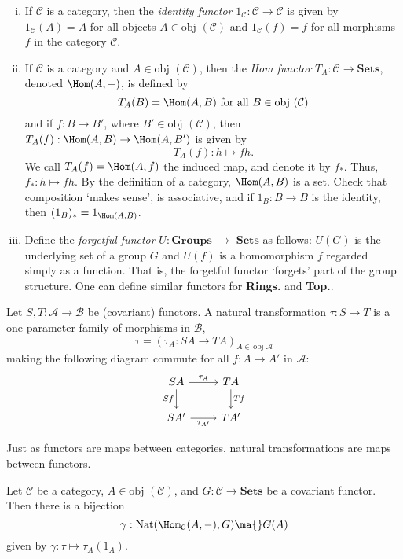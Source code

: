 \begin{ex} \hfill
	\begin{enumerate}[(i)]
	\item If $\mathcal{C}$ is a category, then the \emph{identity functor} $1_\mathcal{C}: \mathcal{C} \to \mathcal{C}$ is given by $1_\mathcal{C}(A)=A$ for all objects $A \in \text{obj }(\mathcal{C})$ and $1_\mathcal{C}(f)=f$ for all morphisms $f$ in the category $\mathcal{C}$.
	\item If $\mathcal{C}$ is a category and $A \in \text{obj }(\mathcal{C})$, then the \emph{Hom functor} $T_A: \mathcal{C} \to \textbf{Sets}$, denoted $\Hom(A, -)$, is defined by
		\[
		T_A(B)= \Hom(A,B) \text{ for all } B \in \text{obj }(\mathcal{C})
		\]
	and if $f: B \to B'$, where $B' \in \text{obj }(\mathcal{C})$, then $T_A(f): \Hom(A,B) \to \Hom(A,B')$ is given by
		\[
		T_A(f): h \mapsto fh.
		\]
	We call $T_A(f)=\Hom(A,f)$ the induced map, and denote it by $f_*$. Thus, $f_*: h \mapsto fh$. By the definition of a category, $\Hom(A,B)$ is a set. Check that composition `makes sense', is associative, and if $1_B: B \to B$ is the identity, then $(1_B)_*=1_{\Hom(A,B)}$. 
	\item Define the \emph{forgetful functor} $U: \textbf{Groups } \to \textbf{ Sets}$ as follows: $U(G)$ is the underlying set of a group $G$ and $U(f)$ is a homomorphism $f$ regarded simply as a function. That is, the forgetful functor `forgets' part of the group structure. One can define similar functors for \textbf{Rings.} and \textbf{Top.}. 
	\end{enumerate} \xqed
\end{ex}


\begin{dfn}
Let $S,T: \mathcal{A} \to \mathcal{B}$ be (covariant) functors. A natural transformation $\tau: S \to T$ is a one-parameter family of morphisms in $\mathcal{B}$,
	\[
	\tau= (\tau_A: SA \to TA)_{A \in \,\text{obj }\mathcal{A}}
	\]
making the following diagram commute for all $f: A \to A'$ in $\mathcal{A}$:
	\[
	\begin{tikzcd}
	SA \arrow{r}{\tau_A} \arrow[swap]{d}{Sf} & TA \arrow{d}{Tf} \\
	SA' \arrow[swap]{r}{\tau_{A'}} & TA'
	\end{tikzcd}
	\]
\end{dfn}

\noindent Just as functors are maps between categories, natural transformations are maps between functors. 


\begin{thm}
Let $\mathcal{C}$ be a category, $A \in \text{obj }(\mathcal{C})$, and $G: \mathcal{C} \to \textbf{Sets}$ be a covariant functor. Then there is a bijection
	\[
	\gamma: \text{Nat}(\Hom_\mathcal{C}(A,-),G) \ma{} G(A)
	\]
given by $\gamma: \tau \mapsto \tau_A(1_A)$. 
\end{thm}


